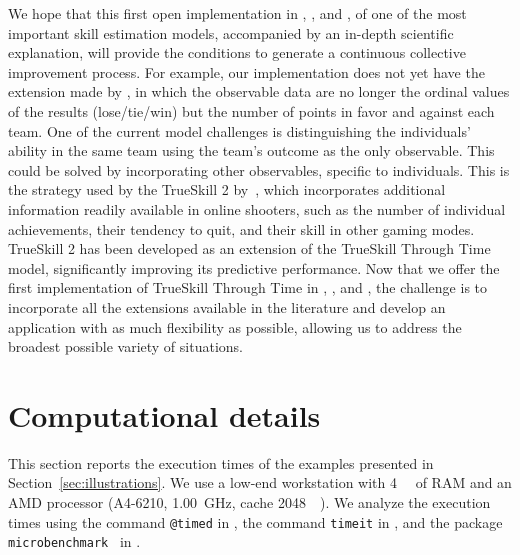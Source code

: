 \documentclass[article]{jss}
\begin{document}
%
%

We hope that this first open implementation in , , and , of one of the most important skill estimation models, accompanied by an in-depth scientific explanation, will provide the conditions to generate a continuous collective improvement process.
For example, our implementation does not yet have the extension made by \cite{Guo2012}, in which the observable data are no longer the ordinal values of the results (lose/tie/win) but the number of points in favor and against each team.
One of the current model challenges is distinguishing the individuals' ability in the same team using the team's outcome as the only observable. 
This could be solved by incorporating other observables, specific to individuals.
This is the strategy used by the TrueSkill 2 by~\cite{minka2018-trueskill2}, which incorporates additional information readily available in online shooters, such as the number of individual achievements, their tendency to quit, and their skill in other gaming modes.
TrueSkill 2 has been developed as an extension of the TrueSkill Through Time model, significantly improving its predictive performance.
Now that we offer the first implementation of TrueSkill Through Time in , , and , the challenge is to incorporate all the extensions available in the literature and develop an application with as much flexibility as possible, allowing us to address the broadest possible variety of situations.

\section*{Computational details}\label{sec:computationDetails}

This section reports the execution times of the examples presented in Section~\ref{sec:illustrations}. 
We use a low-end workstation with \SI{4}{\giga\byte} of RAM and an AMD processor (A4-6210, \SI{1.00}{\giga\hertz}, cache \SI{2048}{\kilo\byte}). 
We analyze the execution times using the command \texttt{@timed} in , the command \texttt{timeit} in , and the package \texttt{microbenchmark}~\citep{MicrobenchmarkR} in . 
\end{document}
